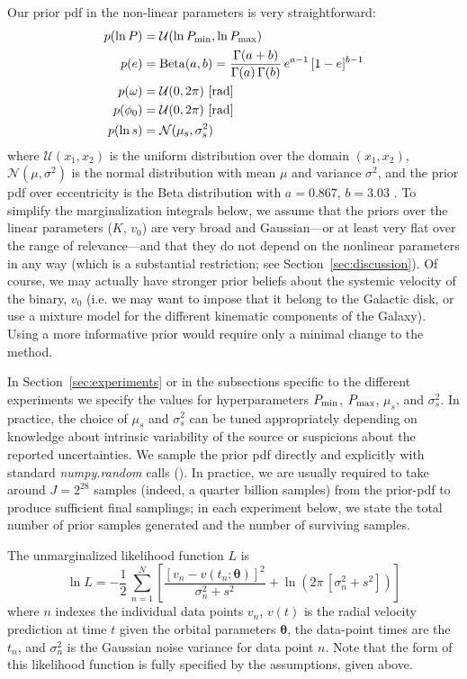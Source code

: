 \documentclass[manuscript, letterpaper]{aastex6}
\newcommand{\project}[1]{\textsl{#1}}
\newcommand{\sectionname}{Section}
\newcommand{\bs}[1]{\boldsymbol{#1}}
\newcommand{\resp}[1]{#1}
\begin{document}
Our prior pdf in the non-linear parameters is very straightforward:
\begin{align}
    p(\ln P) &= \mathcal{U}(\ln P_{\rm min}, \ln P_{\rm max})\\
    p(e) &= {\rm Beta}(a, b) = \frac{\Gamma(a+b)}{\Gamma(a) \, \Gamma(b)} \, e^{a-1} \, [1 - e]^{b-1}\\
    p(\omega) &= \mathcal{U}(0, 2\pi) ~ [{\rm rad}]\\
    p(\phi_0) &= \mathcal{U}(0, 2\pi) ~ [{\rm rad}]\\
    p(\resp{\ln s}) &= \mathcal{N}(\mu_s, \sigma^2_s)
\end{align}
where $\mathcal{U}(x_1, x_2)$ is the uniform distribution over the domain $(x_1,
x_2)$, $\mathcal{N}(\mu, \sigma^2)$ is the normal distribution with mean $\mu$
and variance $\sigma^2$, and the prior pdf over eccentricity is the Beta
distribution with $a=0.867$, $b=3.03$ \citep{Kipping:2013}.
\resp{To simplify the marginalization integrals below, we assume that the priors
over the linear parameters ($K$, $v_0$) are very broad and Gaussian---or at
least very flat over the range of relevance---and that they do not depend on the
nonlinear parameters in any way (which is a substantial restriction; see
\sectionname~\ref{sec:discussion}).
Of course, we may actually have stronger prior beliefs about the systemic
velocity of the binary, $v_0$ (i.e. we may want to impose that it belong to the
Galactic disk, or use a mixture model for the different kinematic components of
the Galaxy).
Using a more informative prior would require only a minimal change to the
method.}

In \sectionname~\ref{sec:experiments} or in the subsections specific to the
different experiments we specify the values for hyperparameters $P_{\rm min}$,
$P_{\rm max}$, $\mu_s$, and $\sigma^2_s$.
In practice, the choice of $\mu_s$ and $\sigma^2_s$ can be tuned appropriately
depending on knowledge about intrinsic variability of the source or suspicions
about the reported uncertainties.
We sample the prior pdf directly and explicitly with standard
\project{numpy.random} calls (\citealt{Van-der-Walt:2011}).
In practice, we are usually required to take around $J=2^{28}$ samples (indeed,
a quarter billion samples) from the prior-pdf to produce sufficient final
samplings; in each experiment below, we state  the total number of prior samples
generated and the number of surviving samples.

The unmarginalized likelihood function $L$ is
\begin{equation}
\ln L = -\frac{1}{2}\,\sum_{n=1}^N \left[\frac{[v_n - v(t_n;\bs{\theta})]^2}{\sigma_n^2 + s^2}
 +\ln \left(2\pi\,[\sigma_n^2 + s^2]\right) \right]
\end{equation}
where $n$ indexes the individual data points $v_n$, $v(t)$ is the radial
velocity prediction at time $t$ given the orbital parameters $\bs{\theta}$, the
data-point times are the $t_n$, and $\sigma_n^2$ is the Gaussian noise variance
for data point $n$.
Note that the form of this likelihood function is fully specified by the
assumptions, given above.
\end{document}
